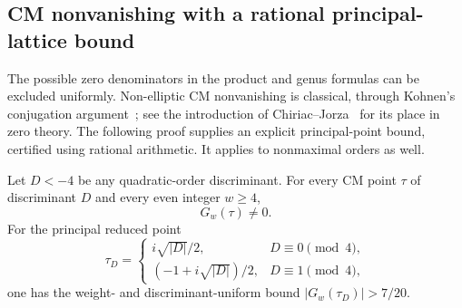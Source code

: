 \subsection{CM nonvanishing with a rational principal-lattice bound}
\label{cmnonzero:sec:nonvanishing}
The possible zero denominators in the product and genus formulas can be
excluded uniformly. Non-elliptic CM nonvanishing is classical, through
Kohnen's conjugation argument~\cite{cmnonzero:Kohnen}; see the introduction
of Chiriac--Jorza~\cite{cmnonzero:ChiriacJorza} for its place in zero theory.
The following proof supplies an explicit principal-point bound, certified
using rational arithmetic. It applies to nonmaximal orders as well.

\begin{theorem}
\label{cmnonzero:thm:allCM}
Let $D<-4$ be any quadratic-order discriminant. For every CM point $\tau$
of discriminant $D$ and every even integer $w\ge4$,
\[
 G_w(\tau)\ne0.
\]
For the principal reduced point
\[
 \tau_D=\begin{cases}i\sqrt{|D|}/2,&D\equiv0\pmod4,\\
 (-1+i\sqrt{|D|})/2,&D\equiv1\pmod4,\end{cases}
\]
one has the weight- and discriminant-uniform bound
$|G_w(\tau_D)|>7/20$.
\end{theorem}

